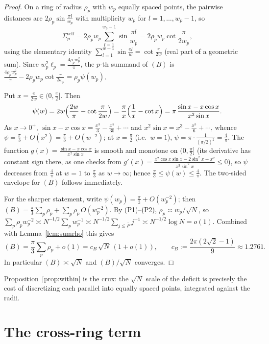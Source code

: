 \documentclass[11pt,reqno]{amsart}
\theoremstyle{definition}
\newcommand{\ol}{\overline}
\newcommand{\rp}{\rho}
\begin{document}
\begin{proof}
On a ring of radius $\rp_p$ with $w_p$ equally spaced points, the pairwise distances are
$2\rp_p\sin\frac{\pi l}{w_p}$ with multiplicity $w_p$ for $l=1,\dots,w_p-1$, so
\[
   \Sigma_p^{\mathrm{self}}=2\rp_p w_p\sum_{l=1}^{w_p-1}\sin\frac{\pi l}{w_p}
   =2\rp_pw_p\cot\frac{\pi}{2w_p},
\]
using the elementary identity $\sum_{l=1}^{w-1}\sin\frac{\pi l}{w}=\cot\frac{\pi}{2w}$ (real part of a
geometric sum). Since $w_p^2\ol\ell_p=\frac{4\rp_pw_p^2}{\pi}$, the $p$-th summand of $(B)$ is
$\frac{4\rp_pw_p^2}{\pi}-2\rp_pw_p\cot\frac{\pi}{2w_p}=\rp_p\psi(w_p)$.

Put $x=\frac{\pi}{2w}\in(0,\frac\pi2]$. Then
\[
   \psi(w)=2w\Bigl(\frac{2w}{\pi}-\cot\frac{\pi}{2w}\Bigr)
          =\frac{\pi}{x}\Bigl(\frac1x-\cot x\Bigr)
          =\pi\,\frac{\sin x-x\cos x}{x^2\sin x}.
\]
As $x\to0^+$, $\sin x-x\cos x=\frac{x^3}{3}-\frac{x^5}{30}+\cdots$ and
$x^2\sin x=x^3-\frac{x^5}{6}+\cdots$, whence $\psi=\frac\pi3+O(x^2)=\frac\pi3+O(w^{-2})$; at
$x=\frac\pi2$ (i.e.\ $w=1$), $\psi=\pi\cdot\frac{1}{(\pi/2)^2}=\frac4\pi$. The function
$g(x)=\frac{\sin x-x\cos x}{x^2\sin x}$ is smooth and monotone on $(0,\frac\pi2]$ (its derivative has
constant sign there, as one checks from $g'(x)=\frac{x^2\cos x\sin x -2\sin^2 x+ x^2}{x^3\sin^2x}\le0$),
so $\psi$ decreases from $\frac4\pi$ at $w=1$ to $\frac\pi3$ as $w\to\infty$; hence
$\frac\pi3\le\psi(w)\le\frac4\pi$. The two-sided envelope for $(B)$ follows immediately.

For the sharper statement, write $\psi(w_p)=\frac\pi3+O(w_p^{-2})$; then
$(B)=\frac\pi3\sum_p\rp_p+\sum_p\rp_p\,O(w_p^{-2})$. By (P1)--(P2), $\rp_p\asymp w_p/\sqrt N$, so
$\sum_p\rp_p w_p^{-2}\asymp N^{-1/2}\sum_p w_p^{-1}\asymp N^{-1/2}\sum_{j\le\ol P}j^{-1}
\asymp N^{-1/2}\log N=o(1)$. Combined with Lemma~\ref{lem:sumrho} this gives
\[
   (B)=\frac\pi3\sum_p\rp_p+o(1)=c_B\,\sqrt N\,(1+o(1)),\qquad
   c_B:=\frac{2\pi(2\sqrt2-1)}{9}\approx 1.2761 .
\]
In particular $(B)\asymp\sqrt N$ and $(B)/\sqrt N$ converges.
\end{proof}

Proposition~\ref{prop:within} is the crux: the $\sqrt N$ scale of the deficit is precisely the cost
of discretizing each parallel into equally spaced points, integrated against the radii.

\section{The cross-ring term}\label{sec:cross}
\end{document}
